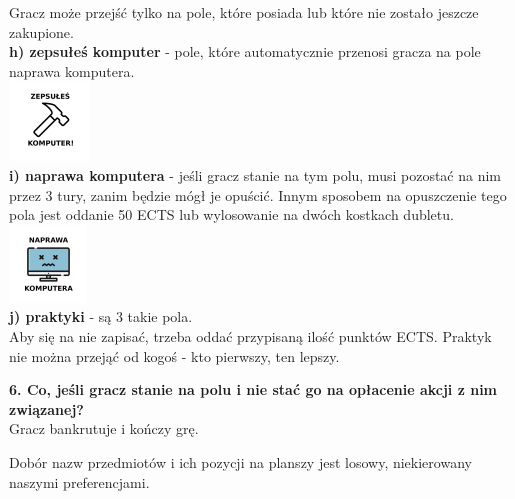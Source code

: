 \documentclass[a4paper]{article}
\begin{document}
\indent Gracz może przejść tylko na pole, które posiada lub które nie zostało jeszcze zakupione. \\
\noindent \textbf{h) zepsułeś komputer} - pole, które automatycznie przenosi gracza na pole naprawa komputera.\\
\indent\includegraphics[scale=0.8]{jail.png}\\
\noindent \textbf{i) naprawa komputera} - jeśli gracz stanie na tym polu, musi pozostać na nim przez 3 tury, zanim będzie mógł je opuścić. Innym sposobem na opuszczenie tego pola jest oddanie 50 ECTS lub wylosowanie na dwóch kostkach dubletu.\\
\indent\includegraphics[scale=0.8]{injail.png}\\
\noindent \textbf{j) praktyki} - są 3 takie pola.\\
\indent Aby się na nie zapisać, trzeba oddać przypisaną ilość punktów ECTS. Praktyk nie można przejąć od kogoś - kto pierwszy, ten lepszy.\\ 
\vspace{10pt}

\noindent \textbf{6. Co, jeśli gracz stanie na polu i nie stać go na opłacenie akcji z nim związanej?}\\
\noindent Gracz bankrutuje i kończy grę.
\vspace{10pt}

\noindent Dobór nazw przedmiotów i ich pozycji na planszy jest losowy, niekierowany naszymi preferencjami.
\end{document}

